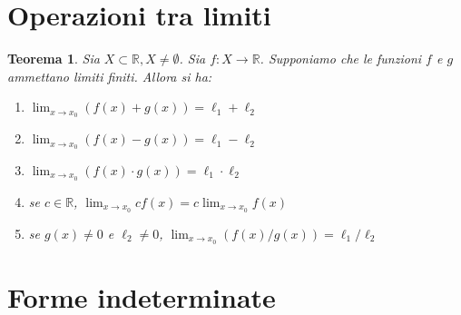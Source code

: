 \documentclass[11pt]{book}
\newtheorem{theorem}{Teorema}[chapter]
\begin{document}
\section{Operazioni tra limiti}
\begin{theorem}
    Sia $X\subset\mathbb{R},X\neq\emptyset$. Sia $f:X\rightarrow\mathbb{R}$. Supponiamo che le funzioni $f$ e $g$ 
    ammettano limiti finiti. Allora si ha:
    \begin{enumerate}
        \item $\lim_{x\rightarrow x_0}(f(x)+g(x))=\ell_1+\ell_2$
        \item $\lim_{x\rightarrow x_0}(f(x)-g(x))=\ell_1-\ell_2$
        \item $\lim_{x\rightarrow x_0}(f(x)\cdot g(x))=\ell_1\cdot \ell_2$
        \item se $c\in\mathbb{R}$, $\lim_{x\rightarrow x_0}cf(x)=c\lim_{x\rightarrow x_0}f(x)$
        \item se $g(x)\neq 0$ e $\ell_2\neq 0$, $\lim_{x\rightarrow x_0}(f(x)/g(x))=\ell_1/\ell_2$
    \end{enumerate}
\end{theorem}
\section{Forme indeterminate}
\end{document}
